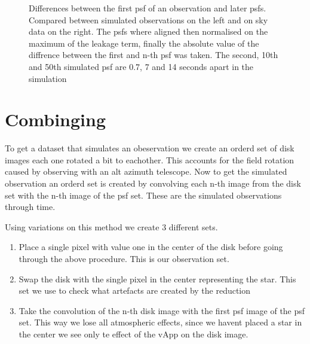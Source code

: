 \begin{figure}[h!]

  \caption{Differences between the first psf of an observation and later psfs. Compared between simulated observations on the left and on sky data on the right. The psfs where aligned then normalised on the maximum of the leakage term, finally the absolute value of the diffrence between the first and n-th psf was taken. The second, 10th and 50th simulated psf are 0.7, 7 and 14 seconds apart in the simulation}
  \label{fig:psfs_evolving}
\end{figure}







\section{Combinging}

To get a dataset that simulates an obeservation we create an orderd set of disk images each one rotated a bit to eachother. This accounts for the field rotation caused by observing with an alt azimuth telescope. Now to get the simulated observation an orderd set is created by convolving each n-th image from the disk set with the n-th image of the psf set. These are the simulated observations through time. 

Using variations on this method we create 3 different sets.

\begin{enumerate}
\item Place a single pixel with value one in the center of the disk before going through the above procedure. This is our observation set.
\item Swap the disk with the single pixel in the center representing the star. This set we use to check what artefacts are created by the reduction 
\item Take the convolution of the n-th disk image with the first psf image of the psf set. This way we lose all atmospheric effects, since we havent placed a star in the center we see only te effect of the vApp on the disk image. 
\end{enumerate}
